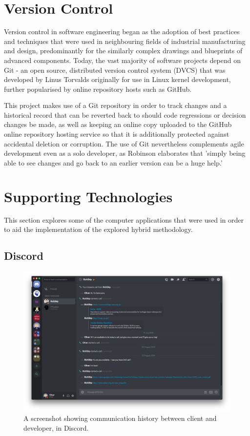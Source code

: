 \section{Version Control}
Version control in software engineering began as the adoption of best practices and techniques that were used in neighbouring fields of industrial manufacturing and design, predominantly for the similarly complex drawings and blueprints of advanced components. \cite{Carstensen1} Today, the vast majority of software projects depend on Git - an open source, distributed version control system (DVCS) that was developed by Linus Torvalds originally for use in Linux kernel development, further popularised by online repository hosts such as GitHub. \cite{LinuxFoundation1}

This project makes use of a Git repository in order to track changes and a historical record that can be reverted back to should code regressions or decision changes be made, as well as keeping an online copy uploaded to the GitHub online repository hosting service so that it is additionally protected against accidental deletion or corruption. The use of Git nevertheless complements agile development even as a solo developer, as Robinson elaborates that 'simply being able to see changes and go back to an earlier version can be a huge help.' \cite{Robinson1}

\section{Supporting Technologies}
This section explores some of the computer applications that were used in order to aid the implementation of the explored hybrid methodology.

\subsection{Discord}
\begin{figure}[h]
    \includegraphics[width=\textwidth]{Figures/discord}
    \caption{A screenshot showing communication history between client and developer, in Discord.}
    \label{fig:discord1}
\end{figure}

